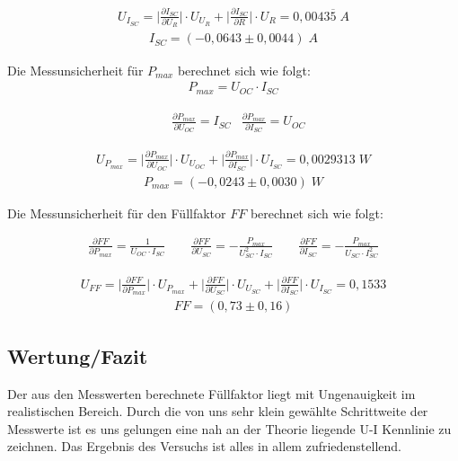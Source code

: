 \documentclass[a4paper]{scrartcl}
\numberwithin{equation}{subsection}
\begin{document}
\begin{align*}
U_{I_{SC}} = \bigg | \frac{\partial I_{SC}}{\partial U_R} \bigg | \cdot U_{U_R} +
\bigg | \frac{\partial I_{SC}}{\partial R} \bigg | \cdot U_R = 0,0043\overline{5} \; A
\end{align*}
\begin{align*}
I_{SC} = (-0,0643 \pm 0,0044)\; A
\end{align*}

Die Messunsicherheit für $P_{max}$ berechnet sich wie folgt:
\begin{align*}
P_{max} = U_{OC} \cdot I_{SC}
\end{align*}

\begin{align}
&\frac{\partial P_{max}}{\partial U_{OC}} = I_{SC}
&\frac{\partial P_{max}}{\partial I_{SC}} = U_{OC}
\end{align}

\begin{align*}
U_{P_{max}} = \bigg | \frac{\partial P_{max}}{\partial U_{OC}} \bigg | \cdot U_{U_{OC}} +
\bigg | \frac{\partial P_{max}}{\partial I_{SC}} \bigg | \cdot U_{I_{SC}} = 0,0029313 \; W
\end{align*}
\begin{align*}
P_{max} = (-0,0243 \pm 0,0030)\; W
\end{align*}

Die Messunsicherheit für den Füllfaktor $FF$ berechnet sich wie folgt:

\begin{align}
\frac{\partial FF}{\partial P_{max}} = \frac{1}{U_{OC} \cdot I_{SC}} \qquad
\frac{\partial FF}{\partial U_{SC}} = -\frac{P_{max}}{U_{SC}^2 \cdot I_{SC}} \qquad
\frac{\partial FF}{\partial I_{SC}} = -\frac{P_{max}}{U_{SC} \cdot I_{SC}^2}
\end{align}

\begin{align*}
U_{FF} = \bigg | \frac{\partial FF}{\partial P_{max}} \bigg | \cdot U_{P_{max}} +
\bigg | \frac{\partial FF}{\partial U_{SC}} \bigg | \cdot U_{U_{SC}} +
\bigg | \frac{\partial FF}{\partial I_{SC}} \bigg | \cdot U_{I_{SC}} = 0,1533
\end{align*}
\begin{align*}
FF = (0,73 \pm 0,16)
\end{align*}

\newpage

\subsection{Wertung/Fazit}
Der aus den Messwerten berechnete Füllfaktor liegt mit Ungenauigkeit im realistischen
Bereich. Durch die von uns sehr klein gewählte Schrittweite der Messwerte ist es uns
gelungen eine nah an der Theorie liegende U-I Kennlinie zu zeichnen.
Das Ergebnis des Versuchs ist alles in allem zufriedenstellend.
\end{document}
